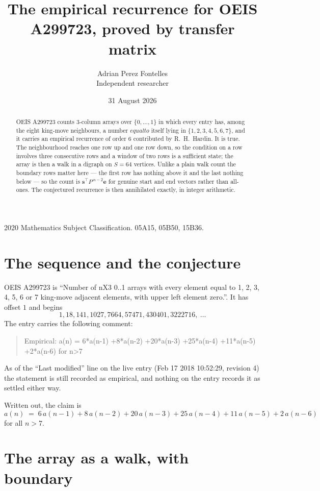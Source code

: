 \documentclass[11pt,a4paper]{article}
\title{The empirical recurrence for OEIS A299723, proved by transfer matrix}
\author{Adrian Perez Fontelles\\ \small Independent researcher}
\date{31 August 2026}
\theoremstyle{plain}
\theoremstyle{definition}
\begin{document}
\maketitle

\begin{abstract}
OEIS A299723 counts $3$-column arrays over $\{0,\dots,1\}$ in which every entry has,
among the eight king-move neighbours, a number $equal to$ itself lying in $\{1,2,3,4,5,6,7\}$, and it carries an empirical
recurrence of order $6$ contributed by R.~H.~Hardin. It is true. The neighbourhood
reaches one row up and one row down, so the condition on a row involves three consecutive
rows and a window of two rows is a sufficient state; the array is then a walk in a digraph
on $S=64$ vertices. Unlike a plain walk count the boundary rows matter here --- the first
row has nothing above it and the last nothing below --- so the count is
$\mathbf{s}^{\!\top}P^{\,n-2}\mathbf{e}$ for genuine start and end vectors rather than
all-ones. The conjectured recurrence is then annihilated exactly, in integer arithmetic.
\end{abstract}

\noindent\small 2020 Mathematics Subject Classification. 05A15, 05B50, 15B36.\normalsize

\section{The sequence and the conjecture}

OEIS A299723 is ``Number of nX3 0..1 arrays with every element equal to 1, 2, 3, 4, 5, 6 or 7 king-move adjacent elements, with upper left element zero.''. It has offset
$1$ and begins
\[
1, 18, 141, 1027, 7664, 57471, 430401, 3222716,\ \dots
\]
The entry carries the following comment:
\begin{quote}\small
Empirical: a(n) = 6*a(n-1) +8*a(n-2) +20*a(n-3) +25*a(n-4) +11*a(n-5) +2*a(n-6) for n>7
\end{quote}
As of the ``Last modified'' line on the live entry (Feb 17 2018 10:52:29, revision
4) the statement is still recorded as empirical, and nothing on the entry
records it as settled either way.

Written out, the claim is
\begin{equation}\label{eq:conj}
a(n)\;=\;6\,a(n-1) + 8\,a(n-2) + 20\,a(n-3) + 25\,a(n-4) + 11\,a(n-5) + 2\,a(n-6)
\end{equation}
for all $n>7$.

\section{The array as a walk, with boundary}
\end{document}
